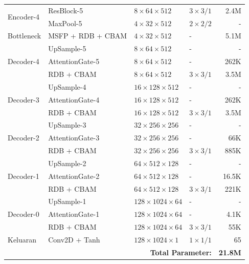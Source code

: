 \begin{table}[H]
{\begin{tabular}{|l|l|p{3cm}|p{3cm}|r|}
\hline
\multirow{2}{*}{Encoder-4}
& ResBlock-5 & $8 \times 64 \times 512$ & $3 \times 3 / 1$ & 2.4M \\
& MaxPool-5 & $4 \times 32 \times 512$ & $2 \times 2 / 2$ & - \\
\hline
Bottleneck & MSFP + RDB + CBAM & $4 \times 32 \times 512$ & - & 5.1M \\
\hline
\multirow{3}{*}{Decoder-4}
& UpSample-5 & $8 \times 64 \times 512$ & - & - \\
& AttentionGate-5 & $8 \times 64 \times 512$ & - & 262K \\
& RDB + CBAM & $8 \times 64 \times 512$ & $3 \times 3 / 1$ & 3.5M \\
\hline
\multirow{3}{*}{Decoder-3}
& UpSample-4 & $16 \times 128 \times 512$ & - & - \\
& AttentionGate-4 & $16 \times 128 \times 512$ & - & 262K \\
& RDB + CBAM & $16 \times 128 \times 512$ & $3 \times 3 / 1$ & 3.5M \\
\hline
\multirow{3}{*}{Decoder-2}
& UpSample-3 & $32 \times 256 \times 256$ & - & - \\
& AttentionGate-3 & $32 \times 256 \times 256$ & - & 66K \\
& RDB + CBAM & $32 \times 256 \times 256$ & $3 \times 3 / 1$ & 885K \\
\hline
\multirow{3}{*}{Decoder-1}
& UpSample-2 & $64 \times 512 \times 128$ & - & - \\
& AttentionGate-2 & $64 \times 512 \times 128$ & - & 16.5K \\
& RDB + CBAM & $64 \times 512 \times 128$ & $3 \times 3 / 1$ & 221K \\
\hline
\multirow{3}{*}{Decoder-0}
& UpSample-1 & $128 \times 1024 \times 64$ & - & - \\
& AttentionGate-1 & $128 \times 1024 \times 64$ & - & 4.1K \\
& RDB + CBAM & $128 \times 1024 \times 64$ & $3 \times 3 / 1$ & 55K \\
\hline
Keluaran & Conv2D + Tanh & $128 \times 1024 \times 1$ & $1 \times 1 / 1$ & 65 \\
\hline
\multicolumn{4}{|r|}{\textbf{Total Parameter:}} & \textbf{21.8M} \\
\hline
\end{tabular}
}
\end{table}